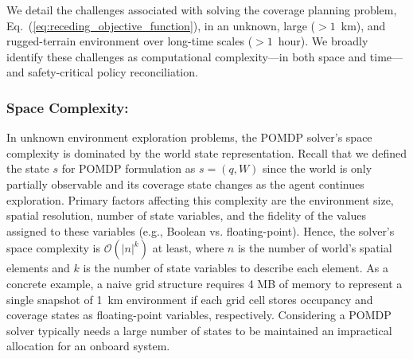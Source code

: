 \documentclass[letterpaper]{article} %
\begin{document}


 
   
We detail the challenges associated with solving the coverage planning problem, Eq.~(\ref{eq:receding_objective_function}), in an unknown, large ($>\!\!1$~km), and rugged-terrain environment over long-time scales ($>\!\!1$~hour). %
We broadly identify these challenges as computational complexity---in both space and time---and safety-critical policy reconciliation.



\subsubsection{Space Complexity:} \hfill
\vspace{-0.25pt}

\noindent
In unknown environment exploration problems, the POMDP solver's space complexity is dominated by the world state representation.
Recall that we defined the state $s$ for POMDP formulation as $s = (q, W)$ since the world is only partially observable and its coverage state changes as the agent continues exploration.
Primary factors affecting this complexity are the environment size, spatial resolution, number of state variables, and the fidelity of the values assigned to these variables (e.g., Boolean vs. floating-point). Hence, the solver's space complexity is $\mathcal{O}(|n|^k)$ at least, where $n$ is the number of world's spatial elements and $k$ is the number of state variables to describe each element.
As a concrete example, a naive grid structure requires 4 MB of memory to represent a single snapshot of 1~km environment if each grid cell stores occupancy and coverage states as floating-point variables, respectively.
Considering a POMDP solver typically needs a large number of states to be maintained 
an impractical allocation for an onboard system.
\end{document}
